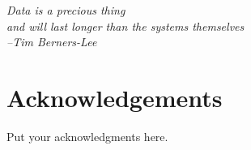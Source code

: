 \phantom{~}

\vfill

\begin{flushright}
    {\em
        Data is a precious thing\\[0.25\baselineskip]
        and will last longer than the systems themselves\\[1.5\baselineskip]
        --Tim Berners-Lee
    }
\end{flushright}

\bigskip

\begingroup

\let\clearpage\relax
\let\cleardoublepage\relax
\let\cleardoublepage\relax

\section*{Acknowledgements}

\noindent Put your acknowledgments here.

\endgroup

\vfill